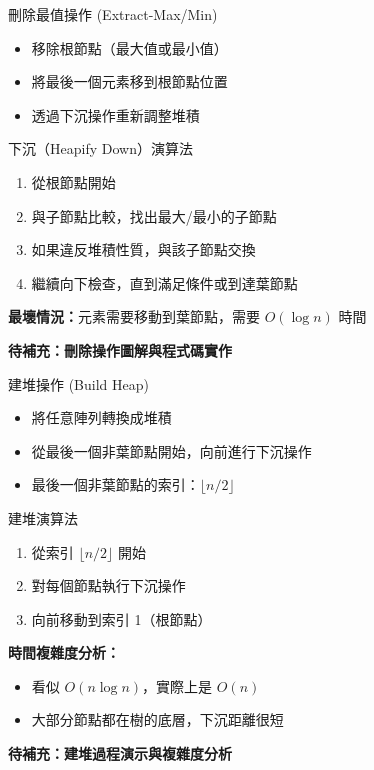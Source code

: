 \documentclass{beamer}
\begin{document}
\begin{frame}{刪除最值操作 (Extract-Max/Min)}
\begin{itemize}
    \item 移除根節點（最大值或最小值）
    \item 將最後一個元素移到根節點位置
    \item 透過下沉操作重新調整堆積
\end{itemize}

\vspace{1em}
\begin{block}{下沉（Heapify Down）演算法}
\begin{enumerate}
    \item 從根節點開始
    \item 與子節點比較，找出最大/最小的子節點
    \item 如果違反堆積性質，與該子節點交換
    \item 繼續向下檢查，直到滿足條件或到達葉節點
\end{enumerate}
\end{block}

\vspace{1em}
\textbf{最壞情況：}元素需要移動到葉節點，需要 $O(\log n)$ 時間

\vspace{1em}
\textbf{待補充：刪除操作圖解與程式碼實作}
\end{frame}

\begin{frame}{建堆操作 (Build Heap)}
\begin{itemize}
    \item 將任意陣列轉換成堆積
    \item 從最後一個非葉節點開始，向前進行下沉操作
    \item 最後一個非葉節點的索引：$\lfloor n/2 \rfloor$
\end{itemize}

\vspace{1em}
\begin{block}{建堆演算法}
\begin{enumerate}
    \item 從索引 $\lfloor n/2 \rfloor$ 開始
    \item 對每個節點執行下沉操作
    \item 向前移動到索引 1（根節點）
\end{enumerate}
\end{block}

\vspace{1em}
\textbf{時間複雜度分析：}
\begin{itemize}
    \item 看似 $O(n \log n)$，實際上是 $O(n)$
    \item 大部分節點都在樹的底層，下沉距離很短
\end{itemize}

\vspace{1em}
\textbf{待補充：建堆過程演示與複雜度分析}
\end{frame}
\end{document}
